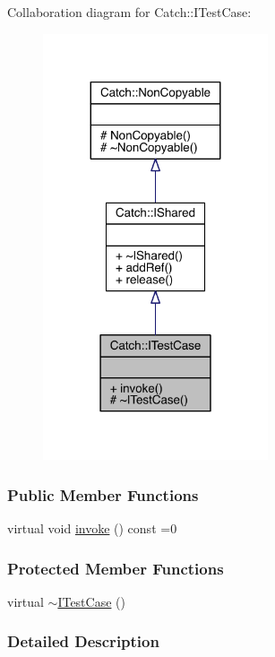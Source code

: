 Collaboration diagram for Catch\+:\+:I\+Test\+Case\+:\nopagebreak
\begin{figure}[H]
\begin{center}
\leavevmode
\includegraphics[width=188pt]{a00224}
\end{center}
\end{figure}
\subsubsection*{Public Member Functions}
\begin{DoxyCompactItemize}
\item 
virtual void \hyperlink{a00045_a678825e62e7c17297621cfeb65588c34}{invoke} () const =0
\end{DoxyCompactItemize}
\subsubsection*{Protected Member Functions}
\begin{DoxyCompactItemize}
\item 
virtual \hyperlink{a00045_add7b9bec455ac1b007c17df82144310e}{$\sim$\+I\+Test\+Case} ()
\end{DoxyCompactItemize}


\subsubsection{Detailed Description}


